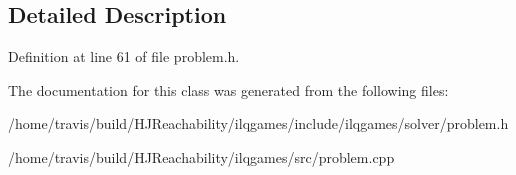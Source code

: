 \subsection{Detailed Description}


Definition at line 61 of file problem.\+h.



The documentation for this class was generated from the following files\+:\begin{DoxyCompactItemize}
\item 
/home/travis/build/\+H\+J\+Reachability/ilqgames/include/ilqgames/solver/problem.\+h\item 
/home/travis/build/\+H\+J\+Reachability/ilqgames/src/problem.\+cpp\end{DoxyCompactItemize}

